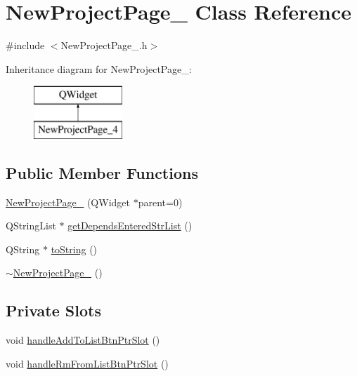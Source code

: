 \hypertarget{class_new_project_page__4}{\section{New\-Project\-Page\-\_ Class Reference}
\label{class_new_project_page__4}
}


{\ttfamily \#include $<$New\-Project\-Page\-\_.\-h$>$}

Inheritance diagram for New\-Project\-Page\-\_\-:\begin{figure}[H]
\begin{center}
\leavevmode
\includegraphics[height=2.000000cm]{class_new_project_page__4}
\end{center}
\end{figure}
\subsection*{Public Member Functions}
\begin{DoxyCompactItemize}
\item 
\hyperlink{class_new_project_page__4_a597c1449a4bc9403c2c0983f19b67aa9}{New\-Project\-Page\-\_} (Q\-Widget $\ast$parent=0)
\item 
Q\-String\-List $\ast$ \hyperlink{class_new_project_page__4_a971279a2a9292d56e4c8e94a071971eb}{get\-Depends\-Entered\-Str\-List} ()
\item 
Q\-String $\ast$ \hyperlink{class_new_project_page__4_a3ade3019e0f7095c4e9b6c04ad6e4229}{to\-String} ()
\item 
\hyperlink{class_new_project_page__4_ac347c7499b828fb711c0af9988ee878a}{$\sim$\-New\-Project\-Page\-\_} ()
\end{DoxyCompactItemize}
\subsection*{Private Slots}
\begin{DoxyCompactItemize}
\item 
void \hyperlink{class_new_project_page__4_a8dabef48460abd6e99968c76f7f4d8b6}{handle\-Add\-To\-List\-Btn\-Ptr\-Slot} ()
\item 
void \hyperlink{class_new_project_page__4_a461870b250be86a8464c9c160b007ce0}{handle\-Rm\-From\-List\-Btn\-Ptr\-Slot} ()
\end{DoxyCompactItemize}
